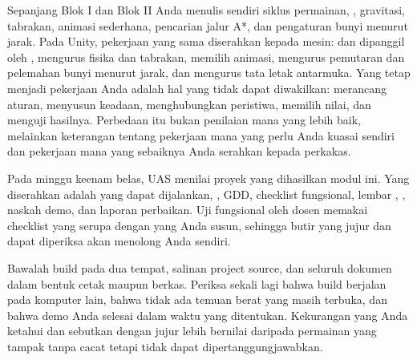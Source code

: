 Sepanjang Blok I dan Blok II Anda menulis sendiri siklus permainan,
, gravitasi, tabrakan, animasi sederhana, pencarian jalur A*,
dan pengaturan bunyi menurut jarak. Pada Unity, pekerjaan yang sama diserahkan
kepada mesin:  dan  dipanggil oleh
,  mengurus fisika dan tabrakan,
 memilih animasi,  mengurus pemutaran
dan pelemahan bunyi menurut jarak, dan  mengurus tata letak
antarmuka. Yang tetap menjadi pekerjaan Anda adalah hal yang tidak dapat
diwakilkan: merancang aturan, menyusun keadaan, menghubungkan peristiwa,
memilih nilai, dan menguji hasilnya. Perbedaan itu bukan penilaian mana yang
lebih baik, melainkan keterangan tentang pekerjaan mana yang perlu Anda kuasai
sendiri dan pekerjaan mana yang sebaiknya Anda serahkan kepada perkakas.


Pada minggu keenam belas, UAS menilai proyek yang dihasilkan modul ini.
Yang diserahkan adalah  yang dapat dijalankan,
, GDD, checklist fungsional, lembar ,
, naskah demo, dan laporan perbaikan. Uji fungsional oleh
dosen memakai checklist yang serupa dengan yang Anda susun, sehingga butir
yang jujur dan dapat diperiksa akan menolong Anda sendiri.

Bawalah build pada dua tempat, salinan project source, dan seluruh dokumen
dalam bentuk cetak maupun berkas. Periksa sekali lagi bahwa build berjalan
pada komputer lain, bahwa tidak ada temuan berat yang masih terbuka, dan bahwa
demo Anda selesai dalam waktu yang ditentukan. Kekurangan yang Anda ketahui
dan sebutkan dengan jujur lebih bernilai daripada permainan yang tampak tanpa
cacat tetapi tidak dapat dipertanggungjawabkan.
